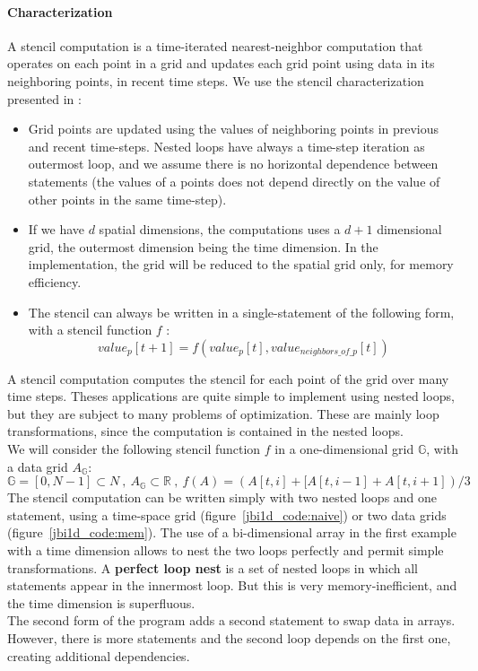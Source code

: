\documentclass[a4paper,11pt]{article}
\begin{document}
\paragraph{Characterization}
A stencil computation is a time-iterated nearest-neighbor computation that operates on
each point in a grid and updates each grid point using data in its neighboring points, in
recent time steps. We use the stencil characterization presented in \cite{bandishti_tiling_2012} :
\begin{itemize}
 \item  Grid points are updated using the values of neighboring points in previous and recent
time-steps. Nested loops have always a time-step iteration as outermost loop, and
we assume there is no horizontal dependence between statements (the values of a
points does not depend directly on the value of other points in the same time-step).
\item If we have $d$ spatial dimensions, the computations uses a $d + 1$ dimensional grid, the
outermost dimension being the time dimension. In the implementation, the grid will
be reduced to the spatial grid only, for memory efficiency.
\item  The stencil can always be written in a single-statement of the following form, with
a stencil function $f$ :
\[value_p[t + 1] = f (value_p[t], value_{neighbors\_of\_p}[t])\]
\end{itemize}
A stencil computation computes the stencil for each point of the grid over many time
steps. Theses applications are quite simple to implement using nested loops, but they are
subject to many problems of optimization. These are mainly loop transformations, since
the computation is contained in the nested loops. \\
We will consider the following stencil function $f$ in a one-dimensional grid $\mathbb{G}$, with a data
grid $A_\mathbb{G}$:
\[\mathbb{G} = [0, N - 1] \subset N \ , \ 
A_\mathbb{G} \subset \mathbb{R} \ , \ 
f (A) = (A[t, i] + [A[t, i - 1] + A[t, i + 1])/3
\]
The stencil computation can be written simply with two nested loops and one statement,
using a time-space grid (figure~\ref{jbi1d_code:naive}) or two data grids 
(figure~\ref{jbi1d_code:mem}). The use of a bi-dimensional array in the first example
with a time dimension allows to nest the two loops perfectly and permit simple transformations. 
A \textbf{perfect loop nest} is a set of nested loops in which all statements appear in the innermost
loop.
But this is very memory-inefficient, and the time dimension is superfluous. \\
The second form of the program adds a second statement to swap data in arrays. However, there 
is more statements and the second loop depends on the first one, creating additional dependencies.
\end{document}
